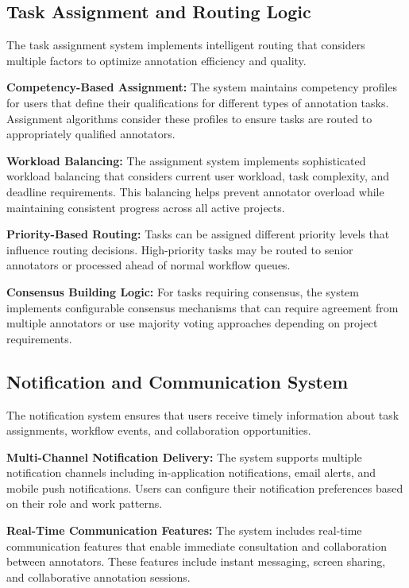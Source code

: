 \subsection{Task Assignment and Routing Logic}

The task assignment system implements intelligent routing that considers multiple factors to optimize annotation efficiency and quality.

\textbf{Competency-Based Assignment:} The system maintains competency profiles for users that define their qualifications for different types of annotation tasks. Assignment algorithms consider these profiles to ensure tasks are routed to appropriately qualified annotators.

\textbf{Workload Balancing:} The assignment system implements sophisticated workload balancing that considers current user workload, task complexity, and deadline requirements. This balancing helps prevent annotator overload while maintaining consistent progress across all active projects.

\textbf{Priority-Based Routing:} Tasks can be assigned different priority levels that influence routing decisions. High-priority tasks may be routed to senior annotators or processed ahead of normal workflow queues.

\textbf{Consensus Building Logic:} For tasks requiring consensus, the system implements configurable consensus mechanisms that can require agreement from multiple annotators or use majority voting approaches depending on project requirements.

\subsection{Notification and Communication System}

The notification system ensures that users receive timely information about task assignments, workflow events, and collaboration opportunities.

\textbf{Multi-Channel Notification Delivery:} The system supports multiple notification channels including in-application notifications, email alerts, and mobile push notifications. Users can configure their notification preferences based on their role and work patterns.

\textbf{Real-Time Communication Features:} The system includes real-time communication features that enable immediate consultation and collaboration between annotators. These features include instant messaging, screen sharing, and collaborative annotation sessions.

